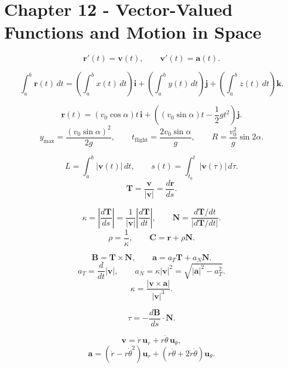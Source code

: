 \section*{Chapter 12 - Vector-Valued Functions and Motion in Space}

\[
  \mathbf r'(t)=\mathbf v(t),
  \qquad
  \mathbf v'(t)=\mathbf a(t).
\]

\[
  \int_a^b\mathbf r(t)\,dt
  =
  \left(\int_a^b x(t)\,dt\right)\mathbf i
  +
  \left(\int_a^b y(t)\,dt\right)\mathbf j
  +
  \left(\int_a^b z(t)\,dt\right)\mathbf k.
\]

\[
  \mathbf r(t)
  =
  (v_0\cos\alpha)t\,\mathbf i
  +
  \left((v_0\sin\alpha)t-\frac12gt^2\right)\mathbf j.
\]
\[
  y_{\max}=\frac{(v_0\sin\alpha)^2}{2g},
  \qquad
  t_{\text{flight}}=\frac{2v_0\sin\alpha}{g},
  \qquad
  R=\frac{v_0^2}{g}\sin2\alpha.
\]

\[
  L=\int_a^b|\mathbf v(t)|\,dt,
  \qquad
  s(t)=\int_{t_0}^{t}|\mathbf v(\tau)|\,d\tau.
\]
\[
  \mathbf T=\frac{\mathbf v}{|\mathbf v|}
  =
  \frac{d\mathbf r}{ds}.
\]

\[
  \kappa=\left|\frac{d\mathbf T}{ds}\right|
  =
  \frac1{|\mathbf v|}\left|\frac{d\mathbf T}{dt}\right|,
  \qquad
  \mathbf N=
  \frac{d\mathbf T/dt}{|d\mathbf T/dt|}.
\]
\[
  \rho=\frac1\kappa,
  \qquad
  \mathbf C=\mathbf r+\rho\mathbf N.
\]

\[
  \mathbf B=\mathbf T\times\mathbf N,
  \qquad
  \mathbf a=a_T\mathbf T+a_N\mathbf N.
\]
\[
  a_T=\frac{d}{dt}|\mathbf v|,
  \qquad
  a_N=\kappa|\mathbf v|^2
  =
  \sqrt{|\mathbf a|^2-a_T^2}.
\]
\[
  \kappa=\frac{|\mathbf v\times\mathbf a|}{|\mathbf v|^3}.
\]

\[
  \tau=-\frac{d\mathbf B}{ds}\cdot\mathbf N.
\]

\[
  \mathbf v=\dot r\,\mathbf u_r+r\dot\theta\,\mathbf u_\theta,
\]
\[
  \mathbf a
  =
  (\ddot r-r\dot\theta^2)\mathbf u_r
  +
  (r\ddot\theta+2\dot r\dot\theta)\mathbf u_\theta.
\]
